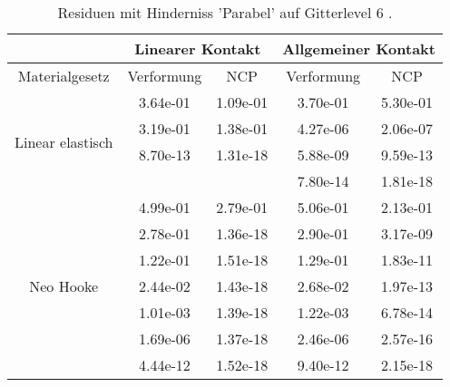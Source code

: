\begin{table} 
\centering 
\begin{tabular}{c|cc|cc|} 
\cline{2-5} 
 & \multicolumn{2}{|c|}{Linearer Kontakt} & \multicolumn{2}{|c|}{Allgemeiner Kontakt} \\ 
\hline 
\multicolumn{1}{|c|}{Materialgesetz} & \multicolumn{1}{c|}{Verformung} & \multicolumn{1}{c|}{NCP} & \multicolumn{1}{c|}{Verformung} & \multicolumn{1}{c|}{NCP} \\ 
\hline 
\multicolumn{1}{|c|}{\multirow{4}{*}{Linear elastisch}} &\multicolumn{1}{|c|}{  3.64e-01} & \multicolumn{1}{|c|}{  1.09e-01} & \multicolumn{1}{|c|}{  3.70e-01} & \multicolumn{1}{|c|}{  5.30e-01} \\ 
\multicolumn{1}{|c|}{} & \multicolumn{1}{|c|}{  3.19e-01} & \multicolumn{1}{|c|}{  1.38e-01} & \multicolumn{1}{|c|}{  4.27e-06} & \multicolumn{1}{|c|}{  2.06e-07} \\ 
\multicolumn{1}{|c|}{} & \multicolumn{1}{|c|}{  8.70e-13} & \multicolumn{1}{|c|}{  1.31e-18} & \multicolumn{1}{|c|}{  5.88e-09} & \multicolumn{1}{|c|}{  9.59e-13} \\ 
\multicolumn{1}{|c|}{} & \multicolumn{1}{|c|}{} & \multicolumn{1}{|c|}{} & \multicolumn{1}{|c|}{  7.80e-14} & \multicolumn{1}{|c|}{  1.81e-18} \\ 
\hline 
\multicolumn{1}{|c|}{\multirow{7}{*}{Neo Hooke}} &\multicolumn{1}{|c|}{  4.99e-01} & \multicolumn{1}{|c|}{  2.79e-01} & \multicolumn{1}{|c|}{  5.06e-01} & \multicolumn{1}{|c|}{  2.13e-01} \\ 
\multicolumn{1}{|c|}{} & \multicolumn{1}{|c|}{  2.78e-01} & \multicolumn{1}{|c|}{  1.36e-18} & \multicolumn{1}{|c|}{  2.90e-01} & \multicolumn{1}{|c|}{  3.17e-09} \\ 
\multicolumn{1}{|c|}{} & \multicolumn{1}{|c|}{  1.22e-01} & \multicolumn{1}{|c|}{  1.51e-18} & \multicolumn{1}{|c|}{  1.29e-01} & \multicolumn{1}{|c|}{  1.83e-11} \\ 
\multicolumn{1}{|c|}{} & \multicolumn{1}{|c|}{  2.44e-02} & \multicolumn{1}{|c|}{  1.43e-18} & \multicolumn{1}{|c|}{  2.68e-02} & \multicolumn{1}{|c|}{  1.97e-13} \\ 
\multicolumn{1}{|c|}{} & \multicolumn{1}{|c|}{  1.01e-03} & \multicolumn{1}{|c|}{  1.39e-18} & \multicolumn{1}{|c|}{  1.22e-03} & \multicolumn{1}{|c|}{  6.78e-14} \\ 
\multicolumn{1}{|c|}{} & \multicolumn{1}{|c|}{  1.69e-06} & \multicolumn{1}{|c|}{  1.37e-18} & \multicolumn{1}{|c|}{  2.46e-06} & \multicolumn{1}{|c|}{  2.57e-16} \\ 
\multicolumn{1}{|c|}{} & \multicolumn{1}{|c|}{  4.44e-12} & \multicolumn{1}{|c|}{  1.52e-18} & \multicolumn{1}{|c|}{  9.40e-12} & \multicolumn{1}{|c|}{  2.15e-18} \\ 
\hline 
\end{tabular}\caption{Residuen mit Hinderniss 'Parabel' auf Gitterlevel 6 .}\label{tab:Residuum_Parabel_level6}
\end{table} 
